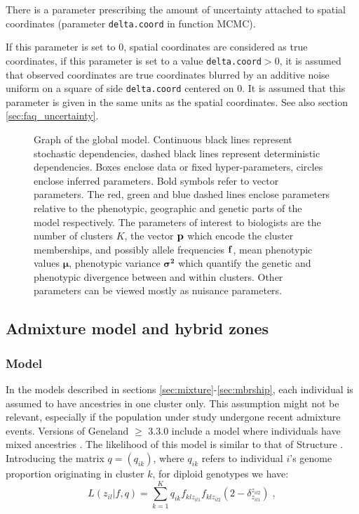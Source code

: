 \documentclass{article}
\begin{document}
There is a parameter prescribing the amount of uncertainty attached to spatial coordinates (parameter \texttt{delta.coord} in function MCMC).

If this parameter is set to 0, spatial coordinates are
    considered as true coordinates, if this parameter is set to a value  \texttt{delta.coord}$>$0, 
it is assumed that observed
  coordinates are true coordinates blurred by an additive noise uniform
  on a square of side \texttt{delta.coord} centered on 0. It is assumed that this parameter is given in  the same units as 
the spatial coordinates. See also section \ref{sec:faq_uncertainty}. 




\begin{figure}[h]
\vspace{-2cm}
\hspace{-1cm}

\caption{Graph of the global model. 
Continuous black lines represent stochastic dependencies, dashed black lines represent 
deterministic dependencies. Boxes enclose data or fixed hyper-parameters, circles enclose inferred parameters. 
Bold symbols refer to vector parameters. 
The red, green and blue dashed lines enclose parameters relative to the phenotypic, 
geographic and genetic parts 
of the model respectively. The parameters of interest to biologists are the number of clusters $K$, 
the vector ${\bf p}$ which encode the cluster memberships,
and possibly  allele frequencies ${\bf f}$, mean phenotypic values $\bm{ \mu}$, phenotypic variance  $\bm{ \sigma^2}$ 
which quantify the genetic and phenotypic 
divergence between and within clusters. 
Other parameters can be viewed mostly as nuisance parameters.}\label{fig:global_dag}
\end{figure}

\clearpage


\subsection{Admixture model and hybrid zones} 

\subsubsection{Model}

In the models described in sections \ref{sec:mixture}-\ref{sec:mbrship}, each individual is assumed to have ancestries in one cluster only. 
This assumption might not be relevant, especially if the population under study undergone recent admixture events. 
Versions of {\sc Geneland} $\geq$  3.3.0 include a model where individuals have mixed ancestries \citep{Guedj11}. 
The likelihood of this model is similar to that of {\sc Structure} \citep{Pritchard00}.
Introducing the matrix $q=(q_{ik})$, where $q_{ik}$ refers to individual $i$'s genome proportion originating in cluster $k$, 
for diploid genotypes we have:
\begin{equation}\label{eq:admix_like}
L(z_{il} | f,q) = \sum_{k=1}^K q_{ik} f_{klz_{il1}}f_{klz_{il2}} (2- \delta_{z_{il1}}^{z_{il2}}) \;,
\end{equation}
\end{document}
